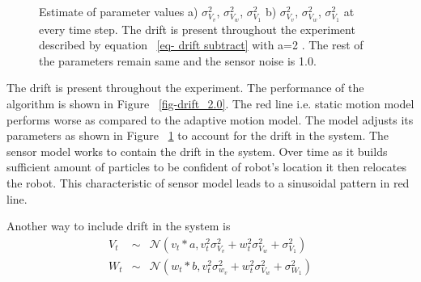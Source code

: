 \documentclass[12pt]{dalcsthesis}
\begin{document}
   
\begin{figure}[!ht]
  \centering
  \caption{\label{fig-drift_motion_model_1.0_trans} Estimate of parameter values a) $\sigma_{V_{v}}^{2}$, $\sigma_{V_{w}}^{2}$,  $\sigma_{V_{1}}^{2}$ b) $\sigma_{V_{v}}^{2}$, $\sigma_{V_{w}}^{2}$,  $\sigma_{V_{1}}^{2}$ at every time step. The drift is present throughout the experiment described by equation ~\ref{eq- drift subtract} with a=2 . The rest of the parameters remain same and the sensor noise is 1.0.}
\end{figure}

The drift is present throughout the experiment. The performance of the algorithm is shown in Figure ~\ref{fig-drift_2.0}. The red line i.e. static motion model performs worse as compared to the adaptive motion model. The model adjusts its parameters as shown in Figure ~\ref{fig-drift_motion_model_1.0_trans} to account for the drift in the system. The sensor model works to contain the drift in the system. Over time as it builds sufficient amount of particles to be confident of robot's location it then relocates the robot. This characteristic of sensor model leads to a sinusoidal pattern in red line.  



Another way to include drift in the system is 
\begin{eqnarray}
\label{eq- drift multiply}
V_{t}&\sim&\mathcal{{N}}(v_{t}*a,v_{t}^{2}\sigma_{V_{v}}^{2}+w_{t}^{2}\sigma_{V_{w}}^{2}+\sigma_{V_{1}}^{2})\\
W_{t}&\sim&\mathcal{{N}}(w_{t}*b,v_{t}^{2}\sigma_{w_{v}}^{2}+w_{t}^{2}\sigma_{V_{w}}^{2}+\sigma_{W_{1}}^{2})
\end{eqnarray}
\end{document}
